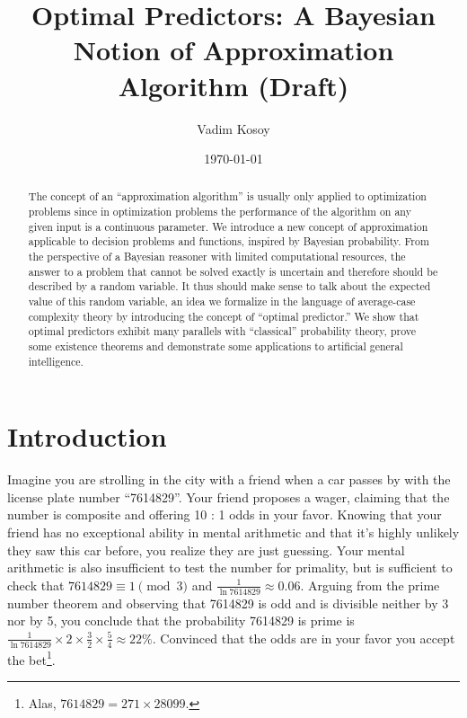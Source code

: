 \documentclass{article}
\numberwithin{equation}{section}
\theoremstyle{definition}
\theoremstyle{plain}
\begin{document}
\title{Optimal Predictors: A Bayesian Notion of Approximation Algorithm (Draft)}


\author{Vadim Kosoy}

\date{\today}

\maketitle

\begin{abstract}
The concept of an \enquote{approximation algorithm} is usually only applied to optimization problems since in optimization problems the performance of the algorithm on any given input is a continuous parameter. We introduce a new concept of approximation applicable to decision problems and functions, inspired by Bayesian probability. From the perspective of a Bayesian reasoner with limited computational resources, the answer to a problem that cannot be solved exactly is uncertain and therefore should be described by a random variable. It thus should make sense to talk about the expected value of this random variable, an idea we formalize in the language of average-case complexity theory by introducing the concept of \enquote{optimal predictor.} We show that optimal predictors exhibit many parallels with \enquote{classical} probability theory, prove some existence theorems and demonstrate some applications to artificial general intelligence.%
\end{abstract}%

\section*{Introduction}
%
Imagine you are strolling in the city with a friend when a car passes by with the license plate number \enquote{7614829}. Your friend proposes a wager, claiming that the number is composite and offering 10 : 1 odds in your favor. Knowing that your friend has no exceptional ability in mental arithmetic and that it's highly unlikely they saw this car before, you realize they are just guessing. Your mental arithmetic is also insufficient to test the number for primality, but is sufficient to check that $7614829 \equiv 1 \pmod{3}$ and $\frac{1}{\ln 7614829} \approx 0.06$. Arguing from the prime number theorem and observing that 7614829 is odd and is divisible neither by 3 nor by 5, you conclude that the probability 7614829 is prime is $\frac{1}{\ln 7614829} \times 2 \times \frac{3}{2} \times \frac{5}{4} \approx 22\%$. Convinced that the odds are in your favor you accept the bet\footnote{Alas, $7614829 = 271 \times 28099$.}.
\end{document}
